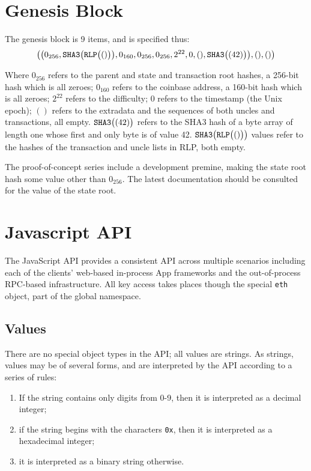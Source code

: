 \documentclass[9pt,oneside]{amsart}
\begin{document}
\section{Genesis Block}\label{app:genesis}

The genesis block is 9 items, and is specified thus:
\begin{equation}
\big( \big( 0_{256}, \mathtt{\tiny SHA3}\big(\mathtt{\tiny RLP}\big( () \big)\big), 0_{160}, 0_{256}, 0_{256}, 2^{22}, 0, (), \mathtt{\tiny SHA3}\big( (42) \big) \big), (), () \big)
\end{equation}

Where $0_{256}$ refers to the parent and state and transaction root hashes, a 256-bit hash which is all zeroes; $0_{160}$ refers to the coinbase address, a 160-bit hash which is all zeroes; $2^{22}$ refers to the difficulty; 0 refers to the timestamp (the Unix epoch); $()$ refers to the extradata and the sequences of both uncles and transactions, all empty. $\mathtt{\tiny SHA3}\big( (42) \big)$ refers to the SHA3 hash of a byte array of length one whose first and only byte is of value 42. $\mathtt{\tiny SHA3}\big(\mathtt{\tiny RLP}\big( () \big)\big)$ values refer to the hashes of the transaction and uncle lists in RLP, both empty.

The proof-of-concept series include a development premine, making the state root hash some value other than $0_{256}$. The latest documentation should be consulted for the value of the state root.

\section{Javascript API}\label{app:jsapi}

The JavaScript API provides a consistent API across multiple scenarios including each of the clients' web-based in-process \DH{}App frameworks and the out-of-process RPC-based infrastructure. All key access takes places though the special \texttt{eth} object, part of the global namespace.

\subsection{Values}
There are no special object types in the API; all values are strings. As strings, values may be of several forms, and are interpreted by the API according to a series of rules:

\begin{enumerate}
\item If the string contains only digits from 0-9, then it is interpreted as a decimal integer;
\item if the string begins with the characters \texttt{0x}, then it is interpreted as a hexadecimal integer;
\item it is interpreted as a binary string otherwise.
\end{enumerate}
\end{document}
